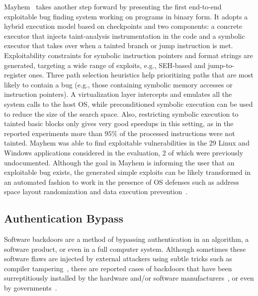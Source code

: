 {\sc Mayhem}~\cite{MAYHEM-SP12} takes another step forward by presenting the first end-to-end exploitable bug finding system working on programs in binary form. It adopts a hybrid execution model based on checkpoints and two components: a concrete executor that injects taint-analysis instrumentation in the code and a symbolic executor that takes over when a tainted branch or jump instruction is met. Exploitability constraints for symbolic instruction pointers and format strings are generated, targeting a wide range of exploits, e.g., SEH-based and jump-to-register ones. Three path selection heuristics help prioritizing paths that are most likely to contain a bug (e.g., those containing symbolic memory accesses or instruction pointers). A virtualization layer intercepts and emulates all the system calls to the host OS, while preconditioned symbolic execution can be used to reduce the size of the search space. Also, restricting symbolic execution to tainted basic blocks only gives very good speedups in this setting, as in the reported experiments more than $95\%$ of the processed instructions were not tainted. {\sc Mayhem} was able to find exploitable vulnerabilities in the 29 Linux and Windows applications considered in the evaluation, 2 of which were previously undocumented. Although the goal in {\sc Mayhem} is informing the user that an exploitable bug exists, the generated simple exploits can be likely transformed in an automated fashion to work in the presence of OS defenses such as address space layout randomization and data execution prevention~\cite{Q-SEC11}. 

\vspace{-1mm} %
\subsection{Authentication Bypass}
\label{ss:auth-bypass}
Software backdoors are a method of bypassing authentication in an algorithm, a software product, or even in a full computer system. Although sometimes these software flaws are injected by external attackers using subtle tricks such as compiler tampering~\cite{KRS-TR74}, there are reported cases of backdoors that have been surreptitiously installed by the hardware and/or software manufacturers~\cite{CZF-USEC14}, or even by governments~\cite{NSA-BACKDOOR}. 

